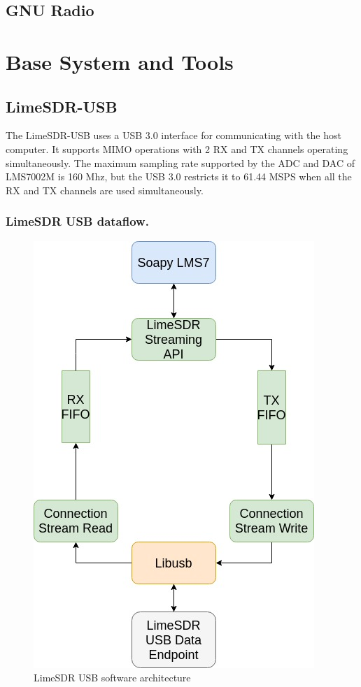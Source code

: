 \subsection{GNU Radio}
\section{Base System and Tools}
 
\subsection{LimeSDR-USB}
The LimeSDR-USB uses a USB 3.0 interface for communicating with the host computer. It supports MIMO operations with 2 RX and TX channels operating simultaneously. The maximum sampling rate supported by the ADC and DAC of LMS7002M is 160 Mhz, but the USB 3.0 restricts it to 61.44 MSPS when all the RX and TX channels are used simultaneously.

\subsubsection{LimeSDR USB dataflow.}
\begin{figure}[h!]
\centering
\includegraphics[scale=0.6]{Figure/Software_Architecture.jpg}
\caption{LimeSDR USB software architecture}
\end{figure}

